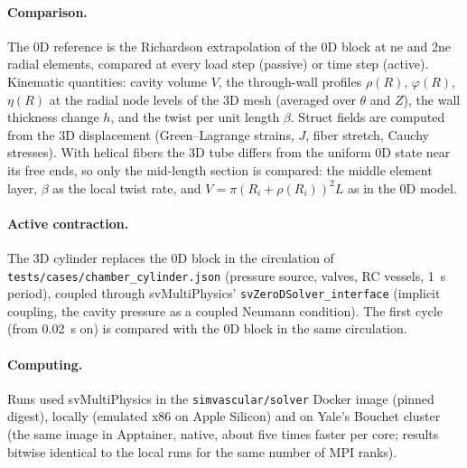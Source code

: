 \paragraph{Comparison.} The 0D reference is the Richardson extrapolation of the 0D
block at ne and 2ne radial elements, compared at every load step (passive) or time step
(active). Kinematic quantities: cavity volume $V$, the through-wall profiles
$\rho(R)$, $\varphi(R)$, $\eta(R)$ at the radial node levels of the 3D mesh (averaged
over $\theta$ and $Z$), the wall thickness change $h$, and the twist per unit length
$\beta$. Struct fields are computed from the 3D displacement (Green--Lagrange strains,
$J$, fiber stretch, Cauchy stresses). With helical fibers the 3D tube differs from the
uniform 0D state near its free ends, so only the mid-length section is compared: the
middle element layer, $\beta$ as the local twist rate, and $V = \pi(R_i + \rho(R_i))^2 L$
as in the 0D model.

\paragraph{Active contraction.} The 3D cylinder replaces the 0D block in the circulation
of \texttt{tests/cases/chamber\_cylinder.json} (pressure source, valves, RC vessels,
1~s period), coupled through svMultiPhysics' \texttt{svZeroDSolver\_interface}
(implicit coupling, the cavity pressure as a coupled Neumann condition). The first
cycle (from 0.02~s on) is compared with the 0D block in the same circulation.

\paragraph{Computing.} Runs used svMultiPhysics in the \texttt{simvascular/solver} Docker
image (pinned digest), locally (emulated x86 on Apple Silicon) and on Yale's Bouchet
cluster (the same image in Apptainer, native, about five times faster per core;
results bitwise identical to the local runs for the same number of MPI ranks).
